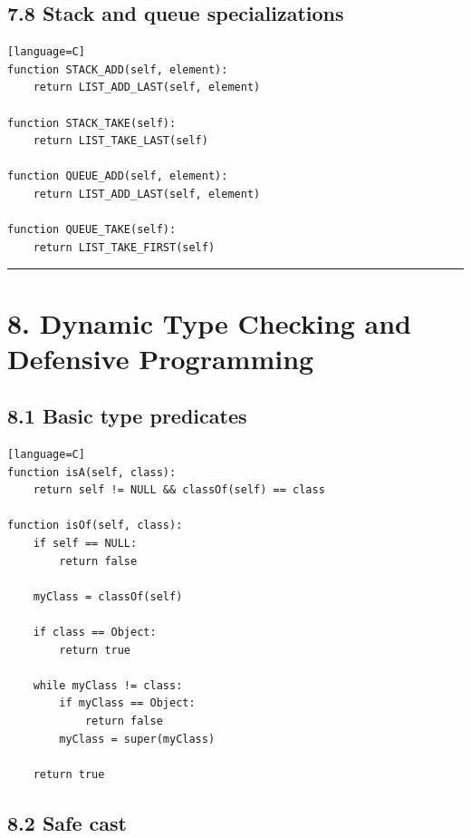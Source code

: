 \documentclass[11pt]{article}
\begin{document}
\subsection{7.8 Stack and queue
specializations}\label{stack-and-queue-specializations}

\begin{verbatim}[language=C]
function STACK_ADD(self, element):
    return LIST_ADD_LAST(self, element)

function STACK_TAKE(self):
    return LIST_TAKE_LAST(self)

function QUEUE_ADD(self, element):
    return LIST_ADD_LAST(self, element)

function QUEUE_TAKE(self):
    return LIST_TAKE_FIRST(self)
\end{verbatim}

\begin{center}\rule{0.5\linewidth}{0.5pt}\end{center}

\section{8. Dynamic Type Checking and Defensive
Programming}\label{dynamic-type-checking-and-defensive-programming}

\subsection{8.1 Basic type predicates}\label{basic-type-predicates}

\begin{verbatim}[language=C]
function isA(self, class):
    return self != NULL && classOf(self) == class

function isOf(self, class):
    if self == NULL:
        return false

    myClass = classOf(self)

    if class == Object:
        return true

    while myClass != class:
        if myClass == Object:
            return false
        myClass = super(myClass)

    return true
\end{verbatim}

\subsection{8.2 Safe cast}\label{safe-cast}
\end{document}
